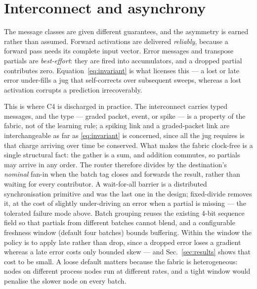 \documentclass[11pt]{article}
\begin{document}
\section{Interconnect and asynchrony}\label{sec:interconnect}

The message classes are given different guarantees, and the asymmetry is earned rather than assumed.
Forward activations are delivered \emph{reliably}, because a forward pass needs its complete input
vector. Error messages and transpose partials are \emph{best-effort}: they are fired into
accumulators, and a dropped partial contributes zero. Equation~\eqref{eq:invariant} is what licenses
this --- a lost or late error under-fills a jug that self-corrects over subsequent sweeps, whereas a
lost activation corrupts a prediction irrecoverably.

This is where C4 is discharged in practice. The interconnect carries typed messages, and the type ---
graded packet, event, or spike --- is a property of the fabric, not of the learning rule; a spiking
link and a graded-packet link are interchangeable as far as \eqref{eq:invariant} is concerned, since
all the jug requires is that charge arriving over time be conserved. What makes the fabric clock-free
is a single structural fact: the gather is a sum, and addition commutes, so partials may arrive in any
order. The router therefore divides by the destination's \emph{nominal} fan-in when the batch tag
closes and forwards the result, rather than waiting for every contributor. A wait-for-all barrier is a
distributed synchronisation primitive and was the last one in the design; fixed-divide removes it, at
the cost of slightly under-driving an error when a partial is missing --- the tolerated failure mode
above. Batch grouping reuses the existing 4-bit sequence field so that partials from different batches
cannot blend, and a configurable freshness window (default four batches) bounds buffering. Within the
window the policy is to apply late rather than drop, since a dropped error loses a gradient whereas a
late error costs only bounded skew --- and Sec.~\ref{sec:results} shows that cost to be small. A loose
default matters because the fabric is heterogeneous: nodes on different process nodes run at different
rates, and a tight window would penalise the slower node on every batch.

\end{document}
